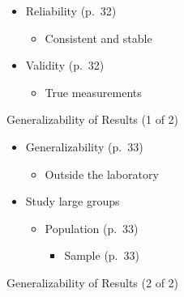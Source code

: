 \documentclass[
]{book}
\providecommand{\tightlist}{%
  \setlength{\itemsep}{0pt}\setlength{\parskip}{0pt}}
\begin{document}
\begin{itemize}
\tightlist
\item
  Reliability (p.~32)

  \begin{itemize}
  \tightlist
  \item
    Consistent and stable\\
  \end{itemize}
\item
  Validity (p.~32)

  \begin{itemize}
  \tightlist
  \item
    True measurements
  \end{itemize}
\end{itemize}

Generalizability of Results (1 of 2)

\begin{itemize}
\tightlist
\item
  Generalizability (p.~33)

  \begin{itemize}
  \tightlist
  \item
    Outside the laboratory\\
  \end{itemize}
\item
  Study large groups

  \begin{itemize}
  \tightlist
  \item
    Population (p.~33)

    \begin{itemize}
    \tightlist
    \item
      Sample (p.~33)
    \end{itemize}
  \end{itemize}
\end{itemize}

Generalizability of Results (2 of 2)
\end{document}
